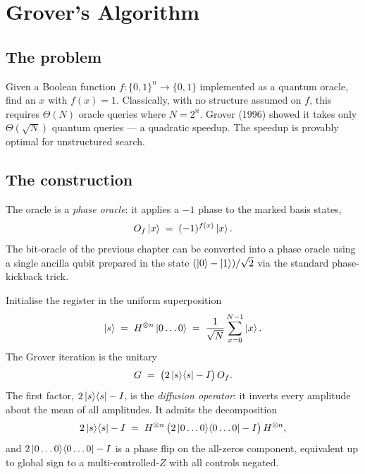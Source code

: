 \setcounter{equation}{0}
\section{Grover's Algorithm}
\label{sec:grover}

\subsection{The problem}

Given a Boolean function $f:\{0,1\}^n \to \{0,1\}$ implemented as a quantum oracle, find an $x$ with $f(x)=1$. Classically, with no structure assumed on $f$, this requires $\Theta(N)$ oracle queries where $N=2^n$. Grover (1996) \cite{fqma96} showed it takes only $\Theta(\sqrt{N})$ quantum queries --- a quadratic speedup. The speedup is provably optimal for unstructured search.

\subsection{The construction}

The oracle is a \emph{phase oracle}: it applies a $-1$ phase to the marked basis states,
\begin{equation}
O_f \mathinner{|{x}\rangle} \;=\; (-1)^{f(x)}\mathinner{|{x}\rangle}.
\end{equation}
The bit-oracle of the previous chapter can be converted into a phase oracle using a single ancilla qubit prepared in the state $(\mathinner{|{0}\rangle}-\mathinner{|{1}\rangle})/\sqrt{2}$ via the standard phase-kickback trick.

Initialise the register in the uniform superposition
\begin{equation}
\mathinner{|{s}\rangle} \;=\; H^{\otimes n}\mathinner{|{0\ldots 0}\rangle} \;=\; \frac{1}{\sqrt{N}}\sum_{x=0}^{N-1} \mathinner{|{x}\rangle}.
\end{equation}
The Grover iteration is the unitary
\begin{equation}
G \;=\; \bigl(2\mathinner{|{s}\rangle}\!\mathinner{\langle{s}|} - I\bigr)\,O_f.
\end{equation}
The first factor, $2\mathinner{|{s}\rangle}\!\mathinner{\langle{s}|} - I$, is the \emph{diffusion operator}: it inverts every amplitude about the mean of all amplitudes. It admits the decomposition
\begin{equation}
2\mathinner{|{s}\rangle}\!\mathinner{\langle{s}|} - I \;=\; H^{\otimes n}\,\bigl(2\mathinner{|{0\ldots 0}\rangle}\!\mathinner{\langle{0\ldots 0}|} - I\bigr)\,H^{\otimes n},
\end{equation}
and $2\mathinner{|{0\ldots 0}\rangle}\!\mathinner{\langle{0\ldots 0}|} - I$ is a phase flip on the all-zeros component, equivalent up to global sign to a multi-controlled-$Z$ with all controls negated.

